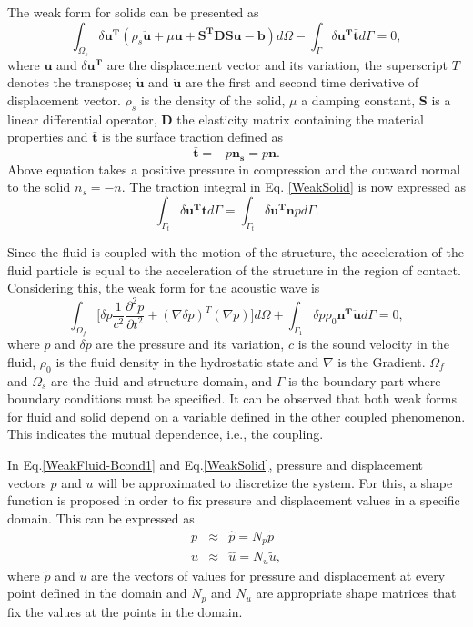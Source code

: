 The weak form for solids can be presented as
\begin{equation}
\int_{\Omega_s} \delta \mathbf{u^T}(\rho_s \ddot{\mathbf{u}}+\mu \dot{\mathbf{u}}+ \mathbf{S^TDSu}-\mathbf{b}) d\Omega - \int_{\Gamma} \delta \mathbf{u^T}\bar{\mathbf{t}} d\Gamma = 0, 
\label{WeakSolid}
\end{equation}
where $\mathbf{u}$ and $\delta \mathbf{u^T}$ are the displacement vector and its variation, the superscript $T$ denotes the transpose; $\dot{\mathbf{u}}$ and $\ddot{\mathbf{u}}$ are the first and second time derivative of displacement vector. $\rho_s$ is the density of the solid, $\mu$ a damping constant, $\mathbf{S}$ is a linear differential operator, $\mathbf{D}$ the elasticity matrix containing the material properties and $\bar{\mathbf{t}}$ is the surface traction defined as
\[
\bar{\mathbf{t}}=-p\mathbf{n_s}= p\mathbf{n}.
\]
Above equation takes a positive pressure in compression and the outward normal to the solid $n_s=-n$. The traction integral in Eq. \ref{WeakSolid} is now expressed as
\[
\int_{\Gamma_t} \delta \mathbf{u^T} \bar{\mathbf{t}} d\Gamma = \int_{\Gamma_t} \delta \mathbf{u^T n}p d\Gamma.
\]

Since the fluid is coupled with the motion of the structure, the acceleration of the fluid particle is equal to the acceleration of the structure in the region of contact. Considering this, the weak form for the acoustic wave is
\begin{equation}
\int_{\Omega_f} \biggr[\delta p \frac{1}{c^2}\frac{\partial^2p}{\partial t^2}+(\nabla \delta p)^T (\nabla p) \biggr] d\Omega + \int_{\Gamma_1} \delta p \rho_0 \mathbf{n^T} \ddot{\mathbf{u}} d\Gamma = 0,
\label{WeakFluid-Bcond1}
\end{equation}
where $p$ and $\delta p$ are the pressure and its variation, $c$ is the sound velocity in the fluid, $\rho_0$ is the fluid density in the hydrostatic state and $\nabla$ is the Gradient. $\Omega_f$ and $\Omega_s$ are the fluid and structure domain, and $\Gamma$ is the boundary part where boundary conditions must be specified. It can be observed that both weak forms for fluid and solid depend on a variable defined in the other coupled phenomenon. This indicates the mutual dependence, i.e., the coupling.

In Eq.\ref{WeakFluid-Bcond1} and Eq.\ref{WeakSolid}, pressure and displacement vectors $p$ and $u$ will be approximated to discretize the system. For this, a shape function is proposed in order to fix pressure and displacement values in a specific domain. This can be expressed as
\begin{eqnarray*}
p & \approx & \hat{p}= N_p\tilde{p}\\
u & \approx & \hat{u}= N_u\tilde{u},
\end{eqnarray*}
where $\tilde{p}$ and $\tilde{u}$ are the vectors of values for pressure and displacement at every point defined in the domain and $N_p$ and $N_u$ are appropriate shape matrices that fix the values at the points in the domain. 


